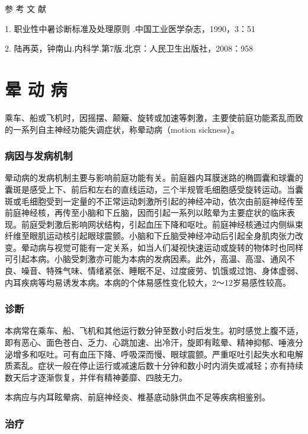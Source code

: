\hypertarget{text00355.htmlux5cux23CHP15-1-4}{}
参 考 文 献

1. 职业性中暑诊断标准及处理原则 .中国工业医学杂志，1990，3：51

2. 陆再英，钟南山.内科学.第7版.北京：人民卫生出版社，2008：958

\protect\hypertarget{text00356.html}{}{}

\chapter{晕 动 病}

乘车、船或飞机时，因摇摆、颠簸、旋转或加速等刺激，主要使前庭功能紊乱而致的一系列自主神经功能失调症状，称晕动病（motion
sickness）。

\subsection{病因与发病机制}

晕动病的发病机制主要与影响前庭功能有关。前庭器内耳膜迷路的椭圆囊和球囊的囊斑是感受上下、前后和左右的直线运动，三个半规管毛细胞感受旋转运动。当囊斑或毛细胞受到一定量的不正常运动刺激所引起的神经冲动，依次由前庭神经传至前庭神经核，再传至小脑和下丘脑，因而引起一系列以眩晕为主要症状的临床表现。前庭受刺激后影响网状结构，引起血压下降和呕吐。前庭神经核通过内侧纵束纤维至眼肌运动核引起眼球震颤。小脑和下丘脑受神经冲动后引起全身肌肉张力改变。晕动病与视觉可能有一定关系，如当人们凝视快速运动或旋转的物体时也同样可引起本病。小脑受刺激亦可能为本病的发病因素。此外，高温、高湿、通风不良、噪音、特殊气味、情绪紧张、睡眠不足、过度疲劳、饥饿或过饱、身体虚弱、内耳疾病等均易诱发本病。本病的个体易感性变化较大，2～12岁易感性较高。

\subsection{诊断}

本病常在乘车、船、飞机和其他运行数分钟至数小时后发生。初时感觉上腹不适，即有恶心、面色苍白、乏力、心跳加速、出冷汗，旋即有眩晕、精神抑郁、唾液分泌增多和呕吐。可有血压下降、呼吸深而慢、眼球震颤。严重呕吐引起失水和电解质紊乱。症状一般在停止运行或减速后数十分钟和数小时内消失或减轻；亦有持续数天后才逐渐恢复，并伴有精神萎靡、四肢无力。

本病应与内耳眩晕病、前庭神经炎、椎基底动脉供血不足等疾病相鉴别。

\subsection{治疗}

